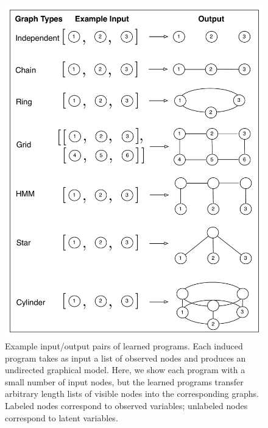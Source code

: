 \documentclass{article} %
\begin{document}
\begin{figure}[h]
\begin{minipage}[t]{.4\textwidth}

  \includegraphics[width=\linewidth]{./figures/tasks.pdf}
  \caption{Example input/output pairs of learned programs. Each induced program takes as input a list of observed nodes and produces an undirected graphical model. Here, we show each program with a small number of input nodes, but the learned programs transfer arbitrary length lists of visible nodes into the corresponding graphs. Labeled nodes correspond to observed variables; unlabeled nodes correspond to latent variables.}
  \label{fig:tasks}
\end{minipage}
\hspace{0.2in}
\begin{minipage}[t]{.5\textwidth}

\end{minipage}
\end{figure}
\end{document}
